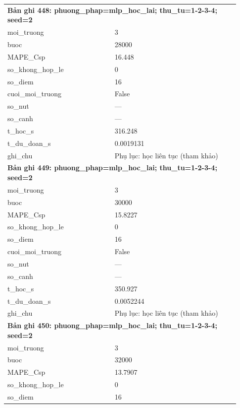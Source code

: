 \begin{longtable}{p{0.43\linewidth}p{0.50\linewidth}}
\midrule
\multicolumn{2}{p{0.95\linewidth}}{\textbf{Bản ghi 448: phuong\_phap=mlp\_hoc\_lai; thu\_tu=1-2-3-4; seed=2}} \\
moi\_\allowbreak truong & 3 \\
buoc & 28000 \\
MAPE\_\allowbreak Csp & 16.448 \\
so\_\allowbreak khong\_\allowbreak hop\_\allowbreak le & 0 \\
so\_\allowbreak diem & 16 \\
cuoi\_\allowbreak moi\_\allowbreak truong & False \\
so\_\allowbreak nut & — \\
so\_\allowbreak canh & — \\
t\_\allowbreak hoc\_\allowbreak s & 316.248 \\
t\_\allowbreak du\_\allowbreak doan\_\allowbreak s & 0.0019131 \\
ghi\_\allowbreak chu & Phụ lục: học liên tục (tham khảo) \\
\midrule
\multicolumn{2}{p{0.95\linewidth}}{\textbf{Bản ghi 449: phuong\_phap=mlp\_hoc\_lai; thu\_tu=1-2-3-4; seed=2}} \\
moi\_\allowbreak truong & 3 \\
buoc & 30000 \\
MAPE\_\allowbreak Csp & 15.8227 \\
so\_\allowbreak khong\_\allowbreak hop\_\allowbreak le & 0 \\
so\_\allowbreak diem & 16 \\
cuoi\_\allowbreak moi\_\allowbreak truong & False \\
so\_\allowbreak nut & — \\
so\_\allowbreak canh & — \\
t\_\allowbreak hoc\_\allowbreak s & 350.927 \\
t\_\allowbreak du\_\allowbreak doan\_\allowbreak s & 0.0052244 \\
ghi\_\allowbreak chu & Phụ lục: học liên tục (tham khảo) \\
\midrule
\multicolumn{2}{p{0.95\linewidth}}{\textbf{Bản ghi 450: phuong\_phap=mlp\_hoc\_lai; thu\_tu=1-2-3-4; seed=2}} \\
moi\_\allowbreak truong & 3 \\
buoc & 32000 \\
MAPE\_\allowbreak Csp & 13.7907 \\
so\_\allowbreak khong\_\allowbreak hop\_\allowbreak le & 0 \\
so\_\allowbreak diem & 16 \\

\end{longtable}
